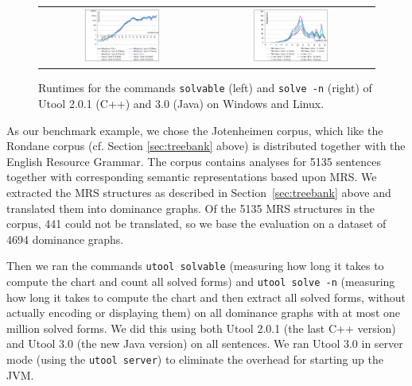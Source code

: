 \begin{figure}
\centering
\begin{tabular}{cc}
\includegraphics[width=0.48\textwidth]{jh-extraction-mean.pdf}
&
\includegraphics[width=0.48\textwidth]{jh-chart-mean.pdf}
\end{tabular}
\caption{Runtimes for the commands \texttt{solvable} (left) and
\texttt{solve -n} (right) of Utool 2.0.1 (C++) and 3.0 (Java) on
Windows and Linux. \label{fig:runtimes}}
\end{figure}

As our benchmark example, we chose the Jotenheimen corpus, which like
the Rondane corpus (cf. Section \ref{sec:treebank} above) is
distributed together with the English Resource Grammar. The corpus
contains analyses for 5135 sentences together with corresponding
semantic representations based upon MRS. We extracted the MRS
structures as described in Section~\ref{sec:treebank} above and
translated them into dominance graphs. Of the 5135 MRS structures in
the corpus, 441 could not be translated, so we base the evaluation on
a dataset of 4694 dominance graphs.

Then we ran the commands
\verb?utool solvable? (measuring how long it takes to compute the
chart and count all solved forms) and \verb?utool solve -n? (measuring
how long it takes to compute the chart and then extract all solved
forms, without actually encoding or displaying them) on all dominance graphs with at most one million solved forms. We did this
using both Utool 2.0.1 (the last C++ version) and Utool 3.0 (the new
Java version) on all sentences. We ran Utool 3.0 in server mode (using
the \verb?utool server?) to eliminate the overhead for starting up the
JVM.


